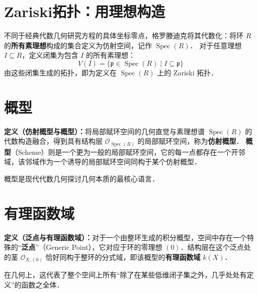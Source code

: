 \section{Zariski拓扑：用理想构造}
不同于经典代数几何研究方程的具体坐标零点，格罗滕迪克将其代数化：将环 $R$ 的\textbf{所有素理想}构成的集合定义为仿射空间，记作 $\operatorname{Spec}(R)$．
对于任意理想 $I \subseteq R$，定义闭集为包含 $I$ 的所有素理想：
$$ V(I) = \{ \mathfrak{p} \in \operatorname{Spec}(R) \mid I \subseteq \mathfrak{p} \} $$
由这些闭集生成的拓扑，即为定义在 $\operatorname{Spec}(R)$ 上的 Zariski 拓扑．

\section{概型}
\begin{framed}
\noindent\textbf{定义（仿射概型与概型）：}将局部赋环空间的几何直觉与素理想谱 $\operatorname{Spec}(R)$ 的代数构造融合，得到具有结构层 $\mathcal{O}_{\operatorname{Spec}(R)}$ 的局部赋环空间，称为\textbf{仿射概型}．
\textbf{概型}（Scheme）则是一个更为一般的局部赋环空间，它的每一点都存在一个开邻域，该邻域作为一个诱导的局部赋环空间同构于某个仿射概型．
\end{framed}
概型是现代代数几何探讨几何本质的最核心语言．

\section{有理函数域}
\begin{framed}
\noindent\textbf{定义（泛点与有理函数域）：}对于一个由整环生成的积分概型，空间中存在一个特殊的“\textbf{泛点}”（Generic Point），它对应于环的零理想 $(0)$．结构层在这个泛点处的茎 $\mathcal{O}_{X, (0)}$ 恰好同构于整环的分式域，即该概型的\textbf{有理函数域} $k(X)$．
\end{framed}
在几何上，这代表了整个空间上所有“除了在某些低维闭子集之外，几乎处处有定义”的函数之全体．